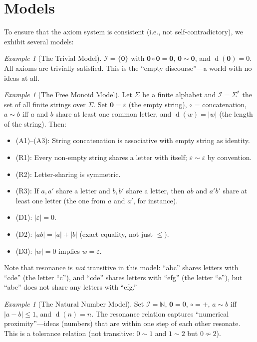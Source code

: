 \documentclass[11pt,openany]{book}
\theoremstyle{definition}
\theoremstyle{plain}
\theoremstyle{remark}
\newtheorem{example}[axiom]{Example}
\newcommand{\IS}{\mathcal{I}}               %
\newcommand{\compose}{\circ}                 %
\newcommand{\void}{\mathbf{0}}              %
\newcommand{\res}{\sim}                      %
\newcommand{\depth}{\operatorname{d}}       %
\begin{document}
\section{Models}

To ensure that the axiom system is consistent (i.e., not self-contradictory), we exhibit several models:

\begin{example}[The Trivial Model]
$\IS = \{\void\}$ with $\void \compose \void = \void$, $\void \res \void$, and $\depth(\void) = 0$. All axioms are trivially satisfied. This is the ``empty discourse''---a world with no ideas at all.
\end{example}

\begin{example}[The Free Monoid Model]
Let $\Sigma$ be a finite alphabet and $\IS = \Sigma^*$ the set of all finite strings over $\Sigma$. Set $\void = \varepsilon$ (the empty string), $\compose$ = concatenation, $a \res b$ iff $a$ and $b$ share at least one common letter, and $\depth(w) = |w|$ (the length of the string). Then:
\begin{itemize}
\item (A1)--(A3): String concatenation is associative with empty string as identity.
\item (R1): Every non-empty string shares a letter with itself; $\varepsilon \res \varepsilon$ by convention.
\item (R2): Letter-sharing is symmetric.
\item (R3): If $a, a'$ share a letter and $b, b'$ share a letter, then $ab$ and $a'b'$ share at least one letter (the one from $a$ and $a'$, for instance).
\item (D1): $|\varepsilon| = 0$.
\item (D2): $|ab| = |a| + |b|$ (exact equality, not just $\leq$).
\item (D3): $|w| = 0$ implies $w = \varepsilon$.
\end{itemize}

Note that resonance is \emph{not} transitive in this model: ``abc'' shares letters with ``cde'' (the letter ``c''), and ``cde'' shares letters with ``efg'' (the letter ``e''), but ``abc'' does not share any letters with ``efg.''
\end{example}

\begin{example}[The Natural Number Model]
Set $\IS = \mathbb{N}$, $\void = 0$, $\compose = +$, $a \res b$ iff $|a - b| \leq 1$, and $\depth(n) = n$. The resonance relation captures ``numerical proximity''---ideas (numbers) that are within one step of each other resonate. This is a tolerance relation (not transitive: $0 \res 1$ and $1 \res 2$ but $0 \not\res 2$).
\end{example}
\end{document}
